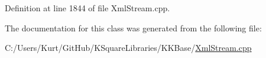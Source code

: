 Definition at line 1844 of file Xml\+Stream.\+cpp.



The documentation for this class was generated from the following file\+:\begin{DoxyCompactItemize}
\item 
C\+:/\+Users/\+Kurt/\+Git\+Hub/\+K\+Square\+Libraries/\+K\+K\+Base/\hyperlink{_xml_stream_8cpp}{Xml\+Stream.\+cpp}\end{DoxyCompactItemize}
